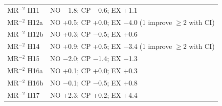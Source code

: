 \begin{table}[H]
\begin{tabular}{@{}l l r l@{}}
MR$^{-2}$ H11 & \multicolumn{3}{l}{NO $-$1.8; CP $-$0.6; EX +1.1} \\
MR$^{-2}$ H12a & \multicolumn{3}{l}{NO +0.5; CP +0.0; EX $-$4.0 (1 improve $\geq$2 with CI)} \\
MR$^{-2}$ H12b & \multicolumn{3}{l}{NO +0.3; CP $-$0.5; EX +0.6} \\
MR$^{-2}$ H14 & \multicolumn{3}{l}{NO +0.9; CP +0.5; EX $-$3.4 (1 improve $\geq$2 with CI)} \\
MR$^{-2}$ H15 & \multicolumn{3}{l}{NO $-$2.0; CP $-$1.4; EX $-$1.3} \\
MR$^{-2}$ H16a & \multicolumn{3}{l}{NO +0.1; CP +0.0; EX +0.3} \\
MR$^{-2}$ H16b & \multicolumn{3}{l}{NO $-$0.1; CP $-$0.5; EX +0.8} \\
MR$^{-2}$ H17 & \multicolumn{3}{l}{NO +2.3; CP +0.2; EX +4.4} \\
\bottomrule\end{tabular}\end{table}
